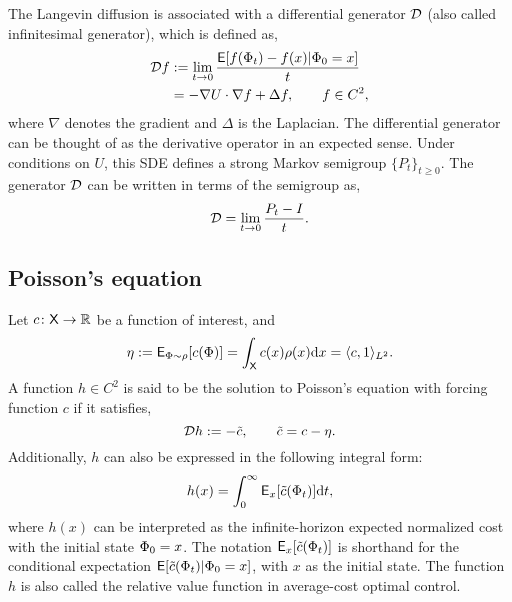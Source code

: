 The Langevin diffusion is associated with a differential generator ${\cal D}$ (also called infinitesimal generator), which is defined as,
\begin{equation}
\begin{aligned}
\generate f &:= \lim_{t \to 0} \frac{\Expect [ f(\markovstate_t) - f(x) | \markovstate_0 = x]}{t} \\
& = -\nabla \pot \cdot \nabla f + \Delta f,\qquad f\in C^2,
\label{e:diff_td_langevin_generator}
\end{aligned}
\end{equation}
where $\nabla$ denotes the gradient and $\Delta$ is the Laplacian. The differential generator can be thought of as the derivative operator in an expected sense. Under conditions on $U$, this SDE defines a strong Markov semigroup $\{P_t\}_{t \geq 0}$. The generator ${\cal D}$ can be written in terms of the semigroup as,
\begin{equation}
\generate = \lim_{t \to 0} \frac{P_t - I}{t}.
\label{e:diff_td_langevin_semigroup}
\end{equation}

\subsection{Poisson's equation}
Let $c \colon {\sf X} \to \mathbb{R}$ be a function of interest, and 
\begin{equation}
\eta := {\sf E}_{\Phi \sim \rho}[c(\Phi)] =  \int_{\sf X} c(x) \rho(x) \text{d} x = \langle c, 1 \rangle_{L^2}.
\end{equation}
A function $h\in C^2$ is said to be the solution to Poisson's equation with forcing function $c$ if it satisfies,
\begin{equation}
\generate h := - \tilc, \qquad  \tilc = c - \eta.
\label{e:diff_td_poissons}
\end{equation}
Additionally, $h$ can also be expressed in the following integral form:
\begin{equation}
h(x) =\int_0^\infty {\sf E}_x[\tilde c(\Phi_t)] \text{d} t,
\end{equation}
where $h(x)$ can be interpreted as the infinite-horizon expected normalized cost with the initial state $\Phi_0 = x$. The notation ${\sf E}_x[\tilde c(\Phi_t)]$ is shorthand for the conditional expectation ${\sf E}[\tilde c(\Phi_t)|\Phi_0 = x]$, with $x$ as the initial state. The function $h$ is also called the relative value function in average-cost optimal control.  

